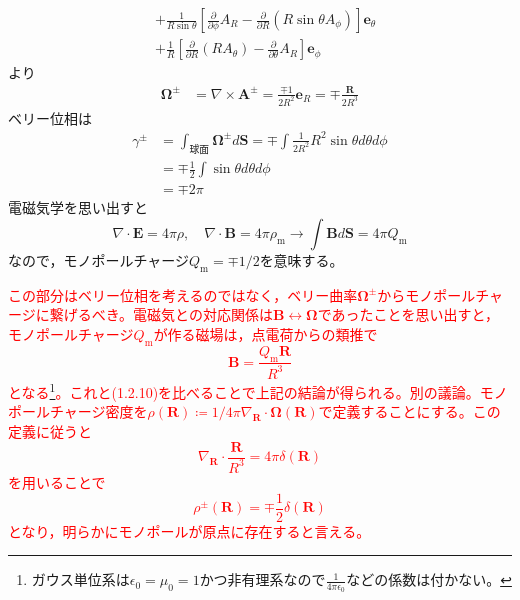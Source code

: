 \documentclass[a4paper,11pt,dvipdfmx]{jsarticle}
\theoremstyle{definition}%
\numberwithin{equation}{section}%
\numberwithin{theorem}{section} %
\begin{document}
\begin{enumerate}[1.]
\begin{align}
    & + \frac{1}{R\sin\theta}\left[\frac{\partial}{\partial\phi}A_R-\frac{\partial}{\partial R}(R\sin\theta A_\phi)\right]\bm{e}_\theta \\
    & +\frac{1}{R}\left[\frac{\partial}{\partial R}(RA_\theta)-\frac{\partial}{\partial\theta}A_R\right]\bm{e}_\phi
  \end{align}
  より
  \begin{align}
    \bm{\Omega}^\pm&=\nabla\times\bm{A}^\pm=\frac{\mp 1}{2R^2}\bm{e}_R=\mp\frac{\bm{R}}{2R^3}\tag{1.2.10}
  \end{align}
  ベリー位相は
  \begin{align}
    \gamma^\pm&=\int_{\text{球面}}\bm{\Omega}^\pm d\bm{S}=\mp\int\frac{1}{2R^2}R^2\sin\theta d\theta d\phi \\
    &=\mp \frac{1}{2} \int\sin\theta d\theta d\phi \\
    &=\mp2\pi \tag{1.2.11}
  \end{align}
  電磁気学を思い出すと
  \begin{equation}
    \nabla \cdot\bm{E}=4\pi\rho, \quad \nabla\cdot\bm{B}=4\pi\rho_{\text{m}}\to\int\bm{B}d\bm{S}=4\pi Q_{\text{m}}
  \end{equation}
  なので，モノポールチャージ\(Q_{\text{m}}=\mp1/2\)を意味する。
  
  \textcolor{red}{この部分はベリー位相を考えるのではなく，ベリー曲率\(\bm{\Omega}^\pm\)からモノポールチャージに繋げるべき。電磁気との対応関係は\(\bm{B}\leftrightarrow\bm{\Omega}\)であったことを思い出すと，モノポールチャージ\(Q_{\text{m}}\)が作る磁場は，点電荷からの類推で
  \begin{equation}
    \bm{B}=\frac{Q_{\text{m}}\bm{R}}{R^3}
  \end{equation}
  となる\footnote{ガウス単位系は\(\epsilon_0=\mu_0=1\)かつ非有理系なので\(\frac{1}{4\pi\epsilon_0}\)などの係数は付かない。}。これと(1.2.10)を比べることで上記の結論が得られる。別の議論。モノポールチャージ密度を\(\rho(\bm{R})\coloneq1/4\pi\nabla_{\bm{R}}\cdot\bm{\Omega}(\bm{R})\)で定義することにする。この定義に従うと
  \begin{equation}
    \nabla_{\bm{R}}\cdot\frac{\bm{R}}{R^3}=4\pi\delta(\bm{R})
  \end{equation}
  を用いることで
  \begin{equation}
    \rho^\pm(\bm{R})=\mp\frac{1}{2}\delta(\bm{R})
  \end{equation}
  となり，明らかにモノポールが原点に存在すると言える。
  }


\end{enumerate}
\end{document}
